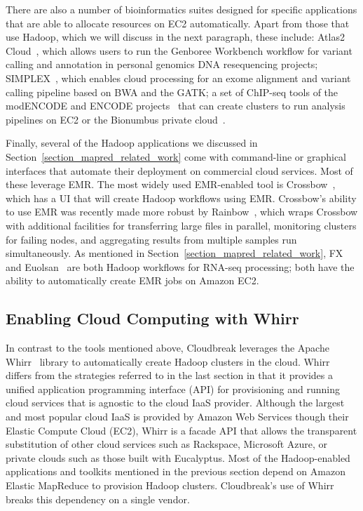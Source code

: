 There are also a number of bioinformatics suites designed for specific applications that are able to allocate resources on EC2 automatically. Apart from those that use Hadoop, which we will discuss in the next paragraph, these include: Atlas2 Cloud~\cite{Evani:2012eq}, which allows users to run the Genboree Workbench workflow for variant calling and annotation in personal genomics DNA resequencing projects; SIMPLEX~\cite{Fischer:2012bt}, which enables cloud processing for an exome alignment and variant calling pipeline based on BWA and the GATK; a set of ChIP-seq tools of the modENCODE and ENCODE projects~\cite{Trinh:2013ii} that can create clusters to run analysis pipelines on EC2 or the Bionumbus private cloud~\cite{bionimbus}.

Finally, several of the Hadoop applications we discussed in Section~\ref{section_mapred_related_work} come with command-line or graphical interfaces that automate their deployment on commercial cloud services. Most of these leverage EMR. The most widely used EMR-enabled tool is Crossbow~\cite{Langmead:2009p1225}, which has a UI that will create Hadoop workflows using EMR. Crossbow's ability to use EMR was recently made more robust by Rainbow~\cite{Zhao:2013hj}, which wraps Crossbow with additional facilities for transferring large files in parallel, monitoring clusters for failing nodes, and aggregating results from multiple samples run simultaneously. As mentioned in Section~\ref{section_mapred_related_work}, FX~\cite{Hong:2012du} and Euolsan~\cite{Jourdren:2012dc} are both Hadoop workflows for RNA-seq processing; both have the ability to automatically create EMR jobs on Amazon EC2.

\subsection{Enabling Cloud Computing with Whirr}

In contrast to the tools mentioned above, Cloudbreak leverages the Apache Whirr~\cite{whirr} library to automatically create Hadoop clusters in the cloud. Whirr differs from the strategies referred to in the last section in that it provides a unified application programming interface (API) for provisioning and running cloud services that is agnostic to the cloud IaaS provider. Although the largest and most popular cloud IaaS is provided by Amazon Web Services though their Elastic Compute Cloud (EC2), Whirr is a facade API that allows the transparent substitution of other cloud services such as Rackspace, Microsoft Azure, or private clouds such as those built with Eucalyptus. Most of the Hadoop-enabled applications and toolkits mentioned in the previous section depend on Amazon Elastic MapReduce to provision Hadoop clusters. Cloudbreak's use of Whirr breaks this dependency on a single vendor.

